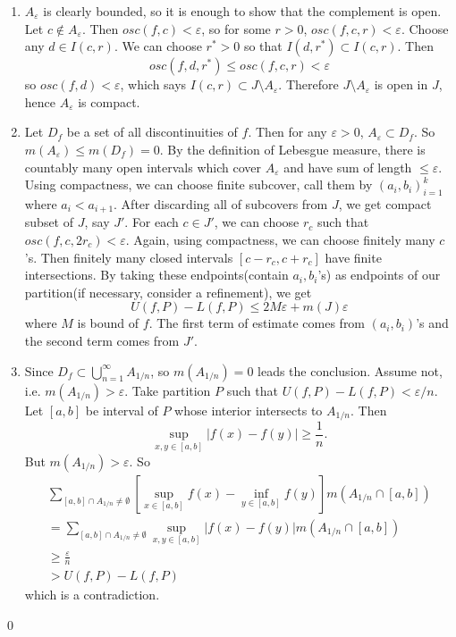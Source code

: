 \begin{problem}[1.4]\hfill

	\begin{enumerate}[label = (\alph*)]
		\item $A_\varepsilon$ is clearly bounded, so it is enough to show that the complement is open.
			Let $c \notin A_{\varepsilon}$.
			Then $osc(f, c) < \varepsilon$, so for some $r>0$, $osc(f, c, r) < \varepsilon$.
			Choose any $d \in I(c, r)$.
			We can choose $r^* > 0$ so that $I(d, r^*) \subset I(c, r)$.
			Then
			\[
				osc(f, d, r^*) \leq osc(f, c, r) < \varepsilon
			\]
			so $osc(f, d) < \varepsilon$, which says $I(c, r) \subset J\setminus A_\varepsilon$.
			Therefore $J \setminus A_\varepsilon$ is open in $J$, hence $A_\varepsilon$ is compact.

		\item Let $D_f$ be a set of all discontinuities of $f$.
			Then for any $\varepsilon >0$, $A_\varepsilon \subset D_f$.
			So $m(A_\varepsilon) \leq m(D_f) = 0$.
			By the definition of Lebesgue measure, there is countably many open intervals which cover $A_\varepsilon$ and have sum of length $\leq \varepsilon$.
			Using compactness, we can choose finite subcover, call them by $(a_i, b_i)_{i=1}^k$ where $a_i < a_{i+1}$.
			After discarding all of subcovers from $J$, we get compact subset of $J$, say $J'$.
			For each $c \in J'$, we can choose $r_c$ such that $osc(f, c, 2r_c) < \varepsilon$.
			Again, using compactness, we can choose finitely many $c$'s.
			Then finitely many closed intervals $\left[ c-r_c, c+r_c \right]$ have finite intersections.
			By taking these endpoints(contain $a_i, b_i$'s) as endpoints of our partition(if necessary, consider a refinement),
			we get 
			\[
				U(f, P) - L(f, P) \leq 2M \varepsilon + m(J) \varepsilon
			\]
			where $M$ is bound of $f$.
			The first term of estimate comes from $(a_i, b_i)$'s and the second term comes from $J'$.

		\item Since $D_f \subset \bigcup_{n=1}^\infty A_{1/n}$, so $m(A_{1/n})= 0$ leads the conclusion.
			Assume not, i.e. $m(A_{1/n}) > \varepsilon$.
			Take partition $P$ such that $U(f, P) - L(f, P) < \varepsilon /n$.
			Let $\left[ a, b \right]$ be interval of $P$ whose interior intersects to $A_{1/n}$.
			Then
			\[
				\sup_{x, y \in \left[ a, b \right]} |f(x) - f(y) | \geq \frac{1}{n}.
			\]
			But $m(A_{1/n}) > \varepsilon$.
			So
			\[
				\begin{split}
					\sum_{\left[ a, b \right]\cap A_{1/n} \ne \emptyset} \left[ \sup_{x \in \left[ a, b \right]}f(x) - \inf_{y \in \left[ a, b \right]} f(y) \right] m\left( A_{1/n} \cap \left[ a, b \right] \right) \\
					 = \sum_{\left[ a, b \right] \cap A_{1/n} \ne \emptyset} \sup_{x, y \in \left[ a, b \right]} \left | f(x) - f(y) \right | m\left( A_{1/n} \cap \left[ a, b \right] \right) \\
					 \geq \frac{\varepsilon}{n} \\
					 > U(f, P) - L(f, P)
				\end{split}
			\]
			which is a contradiction.

	\end{enumerate}
	\qed
\end{problem}
